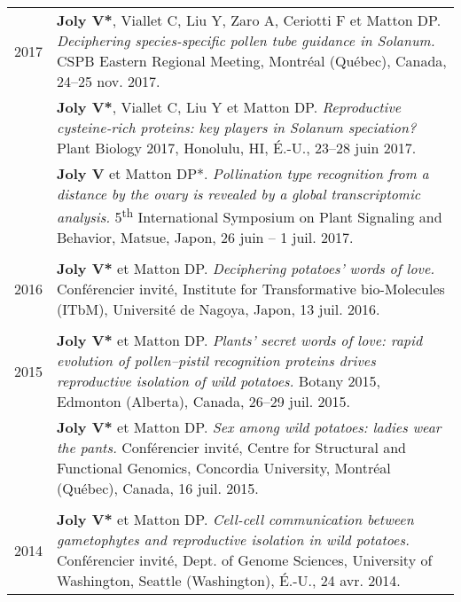 \documentclass[letterpaper,10pt]{article}
\begin{document}
{\begin{tabular}{r|p{14.1cm}}
2017 

& \textbf{Joly V*}, Viallet C, Liu Y, Zaro A, Ceriotti F et Matton DP. \emph{Deciphering species-specific pollen tube guidance in \emph{Solanum}.} CSPB Eastern Regional Meeting, Montréal (Québec), Canada, 24--25 nov. 2017. \vspace{1.5mm} \\

& \textbf{Joly V*}, Viallet C, Liu Y et Matton DP. \emph{Reproductive cysteine-rich proteins: key players in \emph{Solanum} speciation?} Plant Biology 2017, Honolulu, HI, É.-U., 23--28 juin 2017. \vspace{1.5mm}  \\

& \textbf{Joly V} et Matton DP*. \emph{Pollination type recognition from a distance by the ovary is revealed by a global transcriptomic analysis.} 5\textsuperscript{th} International Symposium on Plant Signaling and Behavior, Matsue, Japon, 26 juin -- 1 juil. 2017. \\

\multicolumn{2}{c}{} \\

2016

& \textbf{Joly V*} et Matton DP. \emph{Deciphering potatoes’
words of love.} Conférencier invité, Institute for Transformative bio-Molecules (ITbM), Université de Nagoya, Japon, 13 juil. 2016.\\

\multicolumn{2}{c}{} \\

2015

& \textbf{Joly V*} et Matton DP. \emph{Plants’ secret words of love: rapid evolution of pollen–pistil recognition proteins drives reproductive isolation of wild potatoes.} Botany 2015, Edmonton (Alberta), Canada, 26--29 juil. 2015. \vspace{1.5mm} \\

& \textbf{Joly V*} et Matton DP. \emph{Sex among wild potatoes: ladies wear the pants.} Conférencier invité, Centre for Structural and Functional Genomics, Concordia University, Montréal (Québec), Canada, 16 juil. 2015. \\

\multicolumn{2}{c}{} \\
  
2014

& \textbf{Joly V*} et Matton DP. \emph{Cell-cell communication between gametophytes and reproductive isolation in wild potatoes.} Conférencier invité, Dept. of Genome Sciences, University of Washington, Seattle (Washington), É.-U., 24 avr. 2014. \\


\end{tabular}}
\end{document}
